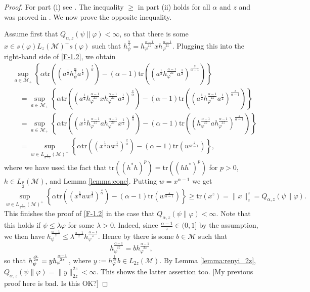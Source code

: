 \documentclass[12pt]{article}
\theoremstyle{definition}
\theoremstyle{remark}
\numberwithin{equation}{section}
\def\Me{\mathcal M}
\def\Tr{\mathrm{tr}}
\def\ffi{\varphi}
\begin{document}
\begin{proof} For part (i) see \cite[Theorem 1(vi)]{kato2023onrenyi}. The inequality $\ge$ in part (ii)
holds for all $\alpha$ and $z$ and was proved in \cite[Theorem 2(vi)]{kato2023onrenyi}. We now prove
the opposite inequality. 

Assume first that $Q_{\alpha,z}(\psi\|\varphi)<\infty$, so that there is some $x\in
s(\varphi)L_z(\Me)^+s(\varphi)$ such that
$h_\psi^{\frac{\alpha}{z}}=h_\varphi^{\frac{\alpha-1}{2z}}xh_\varphi^{\frac{\alpha-1}{2z}}$. Plugging this
into the right-hand side of \eqref{F-1.2}, we obtain
\begin{align}
&\sup_{a\in \Me_+} \left\{\alpha
\Tr\left((a^{\frac12}h_\psi^{\frac{\alpha}{z}}a^{\frac12})^{\frac{z}{\alpha}}\right)-(\alpha-1)
\Tr\left((a^{\frac12}h_\varphi^{\frac{\alpha-1}{2z}}a^{\frac12})^{\frac{z}{\alpha-1}}\right) \right\}
\nonumber\\
&\quad=\sup_{a\in \Me_+} \left\{\alpha
\Tr\left((a^{\frac12}h_\varphi^{\frac{\alpha-1}{2z}}xh_\varphi^{\frac{\alpha-1}{2z}}
a^{\frac12})^{\frac{z}{\alpha}}\right)-(\alpha-1)
\Tr\left((a^{\frac12}h_\varphi^{\frac{\alpha-1}{2z}}a^{\frac12})^{\frac{z}{\alpha-1}}\right) \right\}
\nonumber\\
&\quad=\sup_{a\in \Me_+} \left\{\alpha
\Tr\left((x^{\frac12}h_\varphi^{\frac{\alpha-1}{2z}}ah_\varphi^{\frac{\alpha-1}{2z}}
x^{\frac12})^{\frac{z}{\alpha}}\right)-(\alpha-1)
\Tr\left((h_\varphi^{\frac{\alpha-1}{2z}}a h_\varphi^{\frac{\alpha-1}{2z}}
)^{\frac{z}{\alpha-1}}\right)\right\}\nonumber\\
&\quad=\sup_{w\in L_{\frac{z}{\alpha-1}}(\Me)^+} \left\{\alpha
\Tr\left((x^{\frac12}wx^{\frac12})^{\frac{z}{\alpha}}\right)-(\alpha-1)
\Tr\left(w^{\frac{z}{\alpha-1}}\right)
\right\}, \label{F-1.3}
\end{align}
where we have used the fact that $\Tr\left((h^*h)^p\right)=\Tr\left((hh^*)^p\right)$ for
$p>0$, $h\in L_{\frac{p}{2}}(\Me)$, and Lemma \ref{lemma:cone}.
 Putting $w=x^{\alpha-1}$ we
get
\[
\sup_{w\in L_{\frac{z}{\alpha-1}}(\Me)^+} \left\{\alpha
\Tr\left((x^{\frac12}wx^{\frac12})^{\frac{z}{\alpha}}\right)-(\alpha-1)
\Tr\left(w^{\frac{z}{\alpha-1}}\right)
\right\}\ge \Tr(x^z)=\|x\|_z^z= Q_{\alpha,z}(\psi\|\varphi).
\]
This finishes the proof of \eqref{F-1.2} in the case that $Q_{\alpha,z}(\psi\|\varphi)<\infty$. Note that
this holds if $\psi\le \lambda\varphi$ for some $\lambda>0$. {\color{red}Indeed, since
$\frac{\alpha-1}{z}\in (0,1]$ by the assumption, we then have 
$h_\psi^{\frac{\alpha-1}{z}}\le \lambda^{\frac{\alpha-1}{z}}h_\varphi^{\frac{\alpha-1}{z}}$.
Hence by \cite[Lemma A.58]{hiai2021quantum} there is some $b\in \Me$ such that 
\[
h_\psi^{\frac{\alpha-1}{2z}}=bh_\varphi^{\frac{\alpha-1}{2z}},
\]
so that $h_\psi^{\alpha\over2z}=yh_\ffi^{\alpha-1\over2z}$, where
$y:=h_\varphi^{\frac{1}{2z}}b\in L_{2z}(\Me)$. By Lemma \ref{lemma:renyi_2z},
$Q_{\alpha,z}(\psi\|\varphi)=\|y\|_{2z}^{2z}<\infty$. This shows the latter assertion too.}
{\color{red}[My previous proof here is bad. Is this OK?]}


\end{proof}
\end{document}
